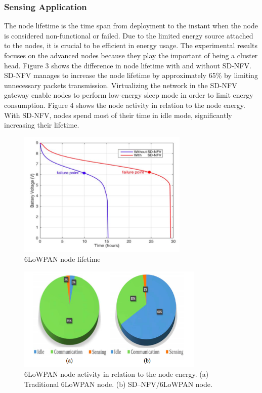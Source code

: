 \documentclass[10pt,journal,compsoc]{IEEEtran}
\begin{document}
\subsubsection{Sensing Application}

The node lifetime is the time span from deployment to the instant when 
the node is considered non-functional or failed. Due to the limited 
energy source attached to the nodes, it is crucial to be efficient 
in energy usage. The experimental results focuses on the advanced nodes 
because they play the important of being a cluster head. Figure 3 
\cite{main} shows the difference in node lifetime with and without SD-NFV. 
SD-NFV manages to increase the node lifetime by approximately 65\% 
by limiting unnecessary packets transmission. Virtualizing the network 
in the SD-NFV gateway enable nodes to perform low-energy sleep mode in 
order to limit energy consumption. Figure 4 \cite{main} shows the 
node activity in relation to the node energy. With SD-NFV, nodes spend 
most of their time in idle mode, significantly increasing their lifetime.

\begin{figure}
    \includegraphics[height=60mm]{node_lifetime}
    \caption{6LoWPAN node lifetime}
\end{figure}

\begin{figure}
    \includegraphics[height=50mm]{node_activity}
    \caption{6LoWPAN node activity in relation to the node energy. 
    (a) Traditional 6LoWPAN node. (b) SD–NFV/6LoWPAN node.}
\end{figure}
\end{document}
